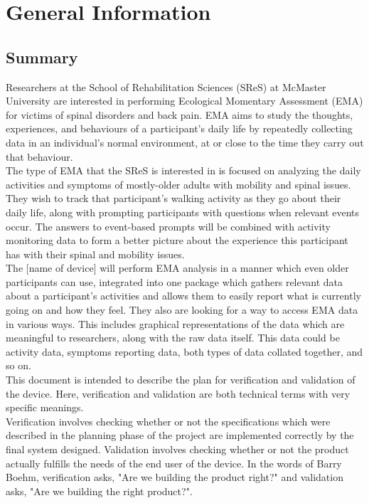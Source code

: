 \documentclass[12pt, titlepage]{article}
\begin{document}
\newpage


\section{General Information}

\subsection{Summary}

Researchers at the School of Rehabilitation Sciences (SReS) at McMaster University are interested in performing Ecological Momentary Assessment (EMA) for victims of spinal disorders and back pain. EMA aims to study the thoughts, experiences, and behaviours of a participant's daily life by repeatedly collecting data in an individual's normal environment, at or close to the time they carry out that behaviour.\\

The type of EMA that the SReS is interested in is focused on analyzing the daily activities and symptoms of mostly-older adults with mobility and spinal issues. They wish to track that participant's walking activity as they go about their daily life, along with prompting participants with questions when relevant events occur. The answers to event-based prompts will be combined with activity monitoring data to form a better picture about the experience this participant has with their spinal and mobility issues.\\

The [name of device] will perform EMA analysis in a manner which even older participants can use, integrated into one package which gathers relevant data about a participant's activities and allows them to easily report what is currently going on and how they feel. They also are looking for a way to access EMA data in various ways. This includes graphical representations of the data which are meaningful to researchers, along with the raw data itself. This data could be activity data, symptoms reporting data, both types of data collated together, and so on. \\

This document is intended to describe the plan for verification and validation of the device. Here, verification and validation are both technical terms with very specific meanings.\\

Verification involves checking whether or not the specifications which were described in the planning phase of the project are implemented correctly by the final system designed. Validation involves checking whether or not the product actually fulfills the needs of the end user of the device. In the words of Barry Boehm, verification asks, "Are we building the product right?" and validation asks, "Are we building the right product?"\cite{pham_1999}.
\end{document}
